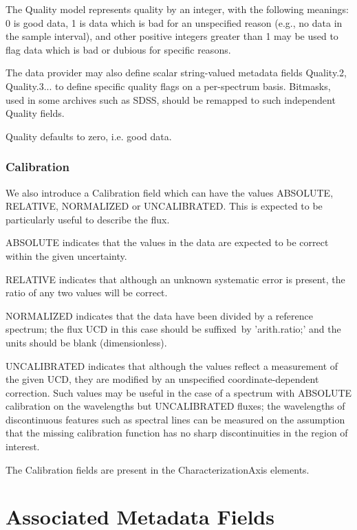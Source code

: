 \documentclass[11pt]{article}
\newcommand{\nchange}[1]{{\color{ired} #1}}
\begin{document}
The Quality model represents quality by an integer, with the following
meanings: 0 is good data, 1 is data which is bad for an unspecified
reason (e.g., no data in the sample interval), and other positive
integers greater than 1 may be used to flag data which is bad or dubious
for specific reasons. 

The data provider may also define scalar string-valued
metadata fields Quality.2, Quality.3...  to define specific quality flags
on a per-spectrum basis. Bitmasks, used in some archives such as SDSS,
should be remapped to such independent Quality fields.

Quality defaults to zero, i.e. good data.

\subsubsection{Calibration}

{We also introduce a Calibration field which can have
the values ABSOLUTE, RELATIVE, NORMALIZED or UNCALIBRATED. This is expected
to be particularly useful to describe the flux. 


ABSOLUTE indicates
that the values in the data are expected to be correct within the
given uncertainty. 

RELATIVE indicates that although an unknown
systematic error is present, the ratio of any two values will be
correct. 

NORMALIZED indicates that the data have been divided by a reference
spectrum; the flux UCD in this case should be {\nchange suffixed}~by 'arith.ratio;' and
the units should be blank (dimensionless).

UNCALIBRATED indicates that although the values reflect a
measurement of the given UCD, they are modified by an unspecified
coordinate-dependent correction. Such values may be useful in the
case of a spectrum with ABSOLUTE calibration on the wavelengths
but UNCALIBRATED fluxes; the wavelengths of discontinuous features 
such as spectral lines can be
measured on the assumption that the missing calibration function
has no sharp discontinuities in the region of interest.
}

The Calibration fields are present in the CharacterizationAxis elements.



\clearpage

\section{Associated Metadata Fields}
\end{document}
